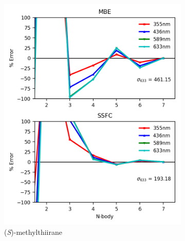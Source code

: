         \begin{figure}
            \begin{subfigure}{0.5\textwidth}
                \centering
                \includegraphics[scale=0.75]{p1/graphs/metthi_6_cam_rot.png}
                \caption{(\textit{S})-methylthiirane}
                \label{metthi_6_rot_cam}
            \end{subfigure}%
            \begin{subfigure}{0.5\textwidth}
                \centering

\end{subfigure}
\end{figure}
